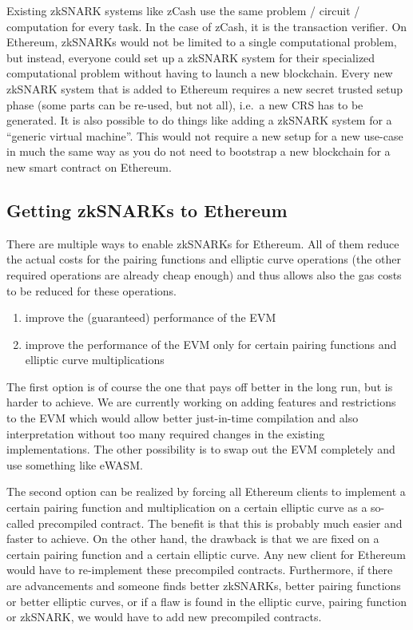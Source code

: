 \documentclass[11pt,letterpaper]{article}
\begin{document}
Existing zkSNARK systems like zCash use the same problem / circuit / computation for every task. In the case of zCash, it is the transaction verifier. On Ethereum, zkSNARKs would not be limited to a single computational problem, but instead, everyone could set up a zkSNARK system for their specialized computational problem without having to launch a new blockchain. Every new zkSNARK system that is added to Ethereum requires a new secret trusted setup phase (some parts can be re-used, but not all), i.e.\ a new CRS has to be generated. It is also possible to do things like adding a zkSNARK system for a ``generic virtual machine''. This would not require a new setup for a new use-case in much the same way as you do not need to bootstrap a new blockchain for a new smart contract on Ethereum.

\subsection{Getting zkSNARKs to Ethereum}


There are multiple ways to enable zkSNARKs for Ethereum. All of them reduce the actual costs for the pairing functions and elliptic curve operations (the other required operations are already cheap enough) and thus allows also the gas costs to be reduced for these operations.
\begin{enumerate}
\itemsep0em 
\item improve the (guaranteed) performance of the EVM
\item improve the performance of the EVM only for certain pairing functions and elliptic curve multiplications
\end{enumerate}


The first option is of course the one that pays off better in the long run, but is harder to achieve. We are currently working on adding features and restrictions to the EVM which would allow better just-in-time compilation and also interpretation without too many required changes in the existing implementations. The other possibility is to swap out the EVM completely and use something like eWASM.


The second option can be realized by forcing all Ethereum clients to implement a certain pairing function and multiplication on a certain elliptic curve as a so-called precompiled contract. The benefit is that this is probably much easier and faster to achieve. On the other hand, the drawback is that we are fixed on a certain pairing function and a certain elliptic curve. Any new client for Ethereum would have to re-implement these precompiled contracts. Furthermore, if there are advancements and someone finds better zkSNARKs, better pairing functions or better elliptic curves, or if a flaw is found in the elliptic curve, pairing function or zkSNARK, we would have to add new precompiled contracts.
\end{document}
